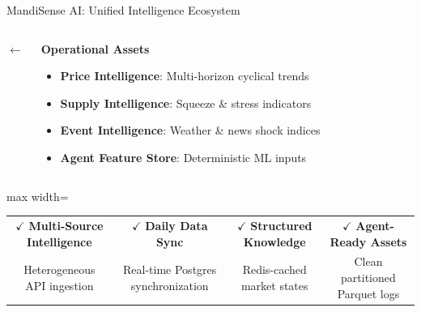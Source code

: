 \documentclass{beamer}
\begin{document}
\begin{frame}{MandiSense AI: Unified Intelligence Ecosystem}
\begin{columns}[T]
    \centering \vspace{1.2cm} \textcolor{primaryLight}{\scriptsize $\leftarrow$}

    \begin{smallcard}[0.98\textwidth]
        \centering
        \textbf{\textcolor{primaryDark}{Operational Assets}}
        \vspace{0.1cm}
        \begin{itemize}
            \tiny
            \item \textbf{Price Intelligence}: Multi-horizon cyclical trends
            \item \textbf{Supply Intelligence}: Squeeze \& stress indicators
            \item \textbf{Event Intelligence}: Weather \& news shock indices
            \item \textbf{Agent Feature Store}: Deterministic ML inputs
        \end{itemize}
    \end{smallcard}
\end{columns}

\vspace{0.25cm}

\begin{herocard}[0.98\textwidth]
    \centering \scriptsize
    \begin{adjustbox}{max width=\linewidth}
    \begin{tabular}{cccc}
        $\checkmark$ \textbf{Multi-Source Intelligence} & 
        $\checkmark$ \textbf{Daily Data Sync} & 
        $\checkmark$ \textbf{Structured Knowledge} & 
        $\checkmark$ \textbf{Agent-Ready Assets} \\
        \tiny \textcolor{textMedium}{Heterogeneous API ingestion} & 
        \tiny \textcolor{textMedium}{Real-time Postgres synchronization} & 
        \tiny \textcolor{textMedium}{Redis-cached market states} & 
        \tiny \textcolor{textMedium}{Clean partitioned Parquet logs}
    \end{tabular}
    \end{adjustbox}
\end{herocard}
\end{frame}

\end{document}
